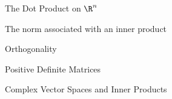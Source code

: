 \documentclass{beamer}
\begin{document}

\begin{frame}{The Dot Product on  $\R^n$}

\begin{itemize}

\end{itemize}
\end{frame}

\begin{frame}{The norm associated with an inner product}

\begin{itemize}

\end{itemize}
\end{frame}

\begin{frame}{Orthogonality}

\begin{itemize}

\end{itemize}
\end{frame}

\begin{frame}{Positive Definite Matrices}

\begin{itemize}

\end{itemize}
\end{frame}

\begin{frame}{Complex Vector Spaces and Inner Products}

\begin{itemize}

\end{itemize}
\end{frame}


\end{document}
